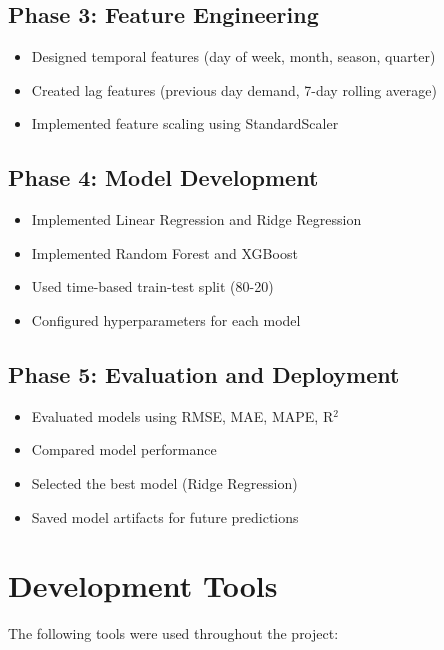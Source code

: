 	\subsection{Phase 3: Feature Engineering}
	\begin{itemize}
		\item Designed temporal features (day of week, month, season, quarter)
		\item Created lag features (previous day demand, 7-day rolling average)
		\item Implemented feature scaling using StandardScaler
	\end{itemize}

	\subsection{Phase 4: Model Development}
	\begin{itemize}
		\item Implemented Linear Regression and Ridge Regression
		\item Implemented Random Forest and XGBoost
		\item Used time-based train-test split (80-20)
		\item Configured hyperparameters for each model
	\end{itemize}

	\subsection{Phase 5: Evaluation and Deployment}
	\begin{itemize}
		\item Evaluated models using RMSE, MAE, MAPE, R$^2$
		\item Compared model performance
		\item Selected the best model (Ridge Regression)
		\item Saved model artifacts for future predictions
	\end{itemize}

	\section{Development Tools}
	The following tools were used throughout the project:

